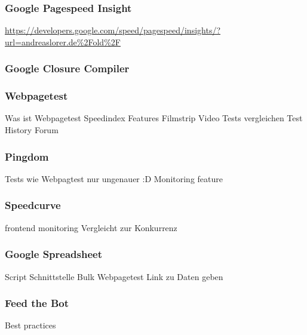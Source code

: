 		\subsubsection{Google Pagespeed Insight} %
		\label{ssub:google_pagespeed_insight}
			\url{https://developers.google.com/speed/pagespeed/insights/?url=andreaslorer.de%2Fold%2F}
		

		\subsubsection{Google Closure Compiler} %
		\label{ssub:closure_compiler}
		

		\subsubsection{Webpagetest} %
		\label{ssub:webpagetest}
			Was ist Webpagetest
			Speedindex
			Features
			  Filmstrip
			  Video
			  Tests vergleichen
			  Test History
			  Forum

		\subsubsection{Pingdom} %
		\label{ssub:pingdom}
			Tests wie Webpagtest nur ungenauer :D
			Monitoring feature

		

		\subsubsection{Speedcurve} %
		\label{ssub:speedcurve}
			frontend monitoring
			Vergleicht zur Konkurrenz

		\subsubsection{Google Spreadsheet} %
		\label{ssub:google_spreadsheet}
			Script Schnittstelle
			Bulk Webpagetest
			Link zu Daten geben
		

		\subsubsection{Feed the Bot} %
		\label{ssub:feed_the_bot}
			Best practices
				
